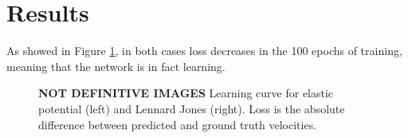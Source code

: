 \documentclass[../../master_thesis_np.tex]{subfiles}
\begin{document}
\section{Results} \label{4results}
As showed in Figure \ref{fig:learning_curve}, in both cases loss decreases in the 100 epochs of training, meaning that the network is in fact learning.

\begin{figure}[b]
	\centering
	\caption{\textbf{NOT DEFINITIVE IMAGES} Learning curve for elastic potential (left) and Lennard Jones (right). Loss is the absolute difference between predicted and ground truth velocities.}
	\label{fig:learning_curve}
\end{figure}
\end{document}
